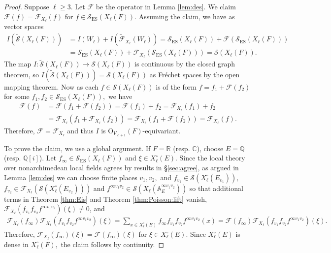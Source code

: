 \documentclass[11pt,a4paper,reqno]{amsart}
\theoremstyle{remark}
\numberwithin{equation}{section}
\newcommand{\A}{\mathbb{A}}
\newcommand{\QQ}{\mathbb{Q}}
\newcommand{\CC}{\mathbb{C}}
\newcommand{\RR}{\mathbb{R}}
\theoremstyle{definition}
\numberwithin{equation}{section}
\begin{document}
\begin{proof}
   Suppose $\ell\ge 3$. Let $\mathcal{F}$ be the operator in Lemma \ref{lem:des}. We claim $\mathcal{F}(f)=\mathcal{F}_{X_\ell}(f)$ for $f\in \mathcal{S}_{\mathrm{ES}}(X_\ell(F))$. Assuming the claim, we have as vector spaces
    \begin{align*}
        I(\widetilde{\mathcal{S}}(X_\ell(F)))&=I(W_\ell)+I(\widetilde{\mathcal{F}}_{X_\ell}(W_\ell))=\mathcal{S}_{\mathrm{ES}}(X_\ell(F))+\mathcal{F}(\mathcal{S}_{\mathrm{ES}}(X_\ell(F)))\\
        &=\mathcal{S}_{\mathrm{ES}}(X_\ell(F))+\mathcal{F}_{X_\ell}(\mathcal{S}_{\mathrm{ES}}(X_\ell(F)))=\mathcal{S}(X_\ell(F)).
    \end{align*}
    The map $I: \widetilde{\mathcal{S}}(X_\ell(F))\longrightarrow \mathcal{S}(X_\ell(F))$ is continuous by the closed graph theorem, so $I(\widetilde{\mathcal{S}}(X_\ell(F)))=\mathcal{S}(X_\ell(F))$ as Fr\'echet spaces by the open mapping theorem. Now as each $f\in \mathcal{S}(X_\ell(F))$ is of the form $f=f_1+\mathcal{F}(f_2)$ for some $f_1,f_2\in \mathcal{S}_{\mathrm{ES}}(X_\ell(F)),$ we have
    \begin{align*}
        \mathcal{F}(f)&=\mathcal{F}(f_1+\mathcal{F}(f_2))=\mathcal{F}(f_1)+f_2=\mathcal{F}_{X_\ell}(f_1)+f_2\\
        &=\mathcal{F}_{X_\ell}(f_1+\mathcal{F}_{X_\ell}(f_2))=\mathcal{F}_{X_\ell}(f_1+\mathcal{F}(f_2))=\mathcal{F}_{X_\ell}(f).
    \end{align*}
    Therefore, $\mathcal{F}=\mathcal{F}_{X_\ell}$ and thus $I$ is $\mathrm{O}_{V_{\ell+1}}(F)$-equivariant.

    To prove the claim, we use a global argument. If $F=\RR$ (resp. $\CC$), choose $E=\QQ$ (resp. $\QQ[i]$). Let $f_\infty\in \mathcal{S}_{\mathrm{ES}}(X_\ell(F))$ and $\xi\in X_\ell^\circ(E).$ Since the local theory over nonarchimedean local fields agrees by results in \S \ref{sec:agree}, as argued in Lemma \ref{lem:des} we can choose finite places $v_1,v_2,$ and $f_{v_1}\in \mathcal{S}(X_\ell^\circ(E_{v_1})),$ $f_{v_2}\in \mathcal{F}_{X_\ell}(\mathcal{S}(X_\ell^\circ(E_{v_2})))$ and $f^{\infty v_1 v_2}\in \mathcal{S}(X_\ell(\A_E^{\infty v_1v_2}))$  so that additional terms in Theorem \ref{thm:Eis} and Theorem \ref{thm:Poisson:lift} vanish, $\mathcal{F}_{X_\ell}(f_{v_1}f_{v_2}f^{\infty v_1v_2})(\xi)\neq 0$, and
    \begin{align*}
        \mathcal{F}_{X_\ell}(f_\infty)\mathcal{F}_{X_\ell}(f_{v_1}f_{v_2}f^{\infty v_1v_2})(\xi)=\sum_{x\in X_\ell^\circ(E)}f_\infty f_{v_1}f_{v_2}f^{\infty v_1v_2}(x)=\mathcal{F}(f_\infty)\mathcal{F}_{X_\ell}(f_{v_1}f_{v_2}f^{\infty v_1v_2})(\xi).
    \end{align*}
    Therefore, $\mathcal{F}_{X_\ell}(f_\infty)(\xi)=\mathcal{F}(f_\infty)(\xi)$ for $\xi\in X_\ell^\circ(E).$ Since $X_\ell^\circ(E)$ is dense in $X_\ell^\circ(F),$ the claim follows by continuity. 


\end{proof}
\end{document}
